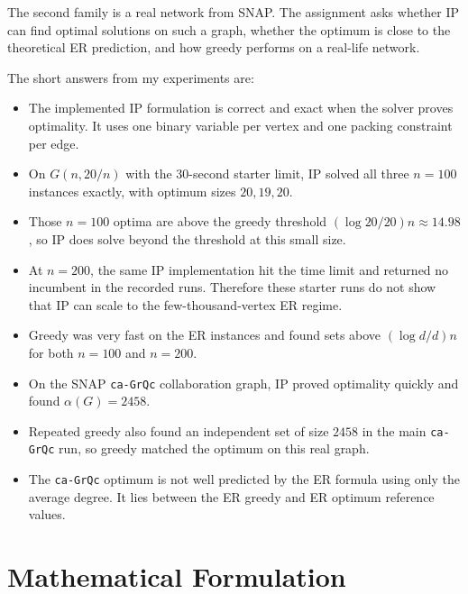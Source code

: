\documentclass[11pt]{article}
\begin{document}
The second family is a real network from SNAP. The assignment asks whether IP
can find optimal solutions on such a graph, whether the optimum is close to the
theoretical ER prediction, and how greedy performs on a real-life network.

The short answers from my experiments are:
\begin{itemize}[leftmargin=*]
  \item The implemented IP formulation is correct and exact when the solver
  proves optimality. It uses one binary variable per vertex and one packing
  constraint per edge.
  \item On $G(n,20/n)$ with the 30-second starter limit, IP solved all three
  $n=100$ instances exactly, with optimum sizes $20,19,20$.
  \item Those $n=100$ optima are above the greedy threshold
  $(\log 20/20)n \approx 14.98$, so IP does solve beyond the threshold at this
  small size.
  \item At $n=200$, the same IP implementation hit the time limit and returned
  no incumbent in the recorded runs. Therefore these starter runs do not show
  that IP can scale to the few-thousand-vertex ER regime.
  \item Greedy was very fast on the ER instances and found sets above
  $(\log d/d)n$ for both $n=100$ and $n=200$.
  \item On the SNAP \texttt{ca-GrQc} collaboration graph, IP proved optimality
  quickly and found $\alpha(G)=2458$.
  \item Repeated greedy also found an independent set of size $2458$ in the
  main \texttt{ca-GrQc} run, so greedy matched the optimum on this real graph.
  \item The \texttt{ca-GrQc} optimum is not well predicted by the ER formula
  using only the average degree. It lies between the ER greedy and ER optimum
  reference values.
\end{itemize}

\section{Mathematical Formulation}
\end{document}
